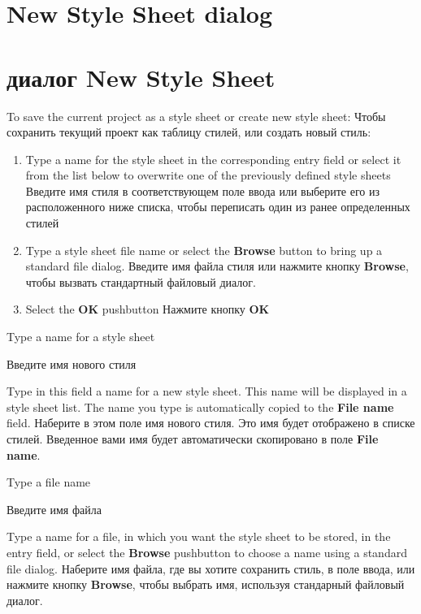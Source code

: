 
\ifenglish
\section{New Style Sheet dialog}
\else
\section{диалог New Style Sheet}
\fi
{}

\ifenglish
To save the current project as a style sheet or create new style sheet:
\else
Чтобы сохранить текущий проект как таблицу стилей, или создать новый стиль:
\fi
\begin{enumerate}
\item \ifenglish
      Type a name for the style sheet in the corresponding entry field
      or select it from the list below to overwrite one of the previously
      defined style sheets
      \else
      Введите имя стиля в соответствующем поле ввода или выберите
      его из расположенного ниже списка, чтобы переписать один из ранее
      определенных стилей
      \fi
\item \ifenglish
       Type a style sheet file name or select the {\bf Browse} button
      to bring up a standard file dialog.
      \else
      Введите имя файла стиля или нажмите кнопку {\bf Browse},
      чтобы вызвать стандартный файловый диалог.
      \fi
\item \ifenglish
      Select the {\bf OK} pushbutton
      \else
      Нажмите кнопку {\bf OK}  
      \fi
\end{enumerate}


\begin{popup}
\ifenglish
\caption{Type a name for a style sheet}
\else
\caption{Введите имя нового стиля}
\fi
{}

\ifenglish
Type in this field a name for a new style sheet. This name will be displayed
in a style sheet list. The name you type is automatically copied to
the {\bf File name} field.
\else
Наберите в этом поле имя нового стиля. Это имя будет отображено в 
списке стилей. Введенное вами имя будет автоматически скопировано
в поле {\bf File name}.
\fi
\end{popup}

\begin{popup}
\ifenglish
\caption{Type a file name}
\else
\caption{Введите имя файла}
\fi
{}

\ifenglish
Type a name for a file, in which you want the style sheet to be stored,
in the entry field, or select the {\bf Browse} pushbutton to choose a name
using a standard file dialog.
\else
Наберите имя файла, где вы хотите сохранить стиль, в поле ввода,
или нажмите кнопку {\bf Browse}, чтобы выбрать имя, используя стандарный файловый 
диалог.
\fi
\end{popup}

